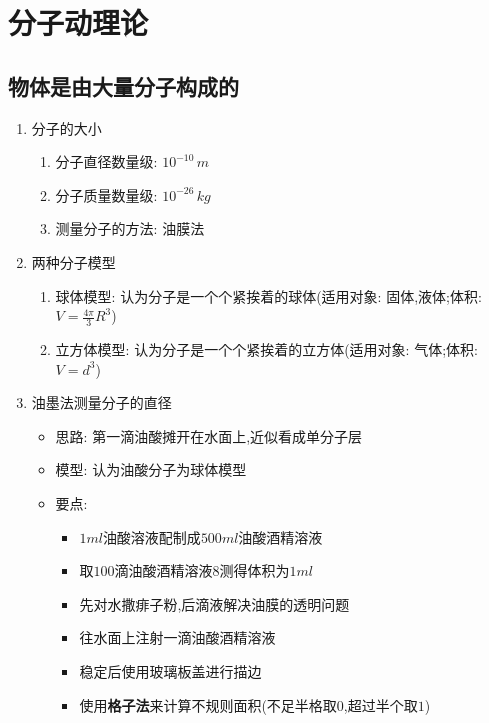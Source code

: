 \documentclass{article}
\begin{document}
\vspace{2em}

\section{分子动理论}

\subsection{物体是由大量分子构成的}
\begin{enumerate}
    \item 分子的大小
          \begin{enumerate}[label = (\arabic*{})]
              \item 分子直径数量级: $10^{-10} \, m$
              \item 分子质量数量级: $10^{-26} \, kg$
              \item 测量分子的方法: 油膜法
          \end{enumerate}

          \vspace{2em}

    \item 两种分子模型
          \begin{enumerate}[label = (\arabic*{})]
              \item 球体模型: 认为分子是一个个紧挨着的球体(适用对象: 固体,液体;体积:$V = \frac{4\pi}{3} R^{3}$)
              \item 立方体模型: 认为分子是一个个紧挨着的立方体(适用对象: 气体;体积:$V = d^{3}$)
          \end{enumerate}

          \vspace{2em}

    \item 油墨法测量分子的直径
          \begin{itemize}
              \item 思路: 第一滴油酸摊开在水面上,近似看成单分子层
              \item 模型: 认为油酸分子为球体模型
              \item 要点:
                    \begin{itemize}
                        \item $1ml$油酸溶液配制成$500ml$油酸酒精溶液
                        \item 取$100$滴油酸酒精溶液8测得体积为$1ml$
                        \item 先对水撒痱子粉,后滴液解决油膜的透明问题
                        \item 往水面上注射一滴油酸酒精溶液
                        \item 稳定后使用玻璃板盖进行描边
                        \item 使用\textbf{格子法}来计算不规则面积(不足半格取$0$,超过半个取$1$)
                    \end{itemize}
          \end{itemize}


\end{enumerate}
\end{document}

